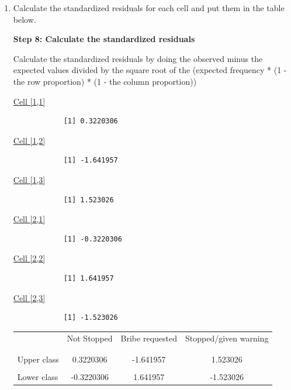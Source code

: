 \documentclass[12pt,letterpaper]{article}
\begin{document}
\begin{enumerate}
		\newpage
		
		\item [(c)] Calculate the standardized residuals for each cell and put them in the table below.
		
		\vspace{.5cm}
		
		\noindent \textbf{Step 8: Calculate the standardized residuals}
		
		\noindent Calculate the standardized residuals by doing the observed minus the expected values divided by the square root of the (expected frequency * (1 - the row proportion) * (1 - the column proportion))
		
		\vspace{1cm}
		
		\noindent \underline{Cell [1,1]}
		  
		\begin{verbatim}
			[1] 0.3220306
		\end{verbatim}
		
		\noindent \underline{Cell [1,2]}
		  
		\begin{verbatim}
			[1] -1.641957
		\end{verbatim}
		
		\noindent \underline{Cell [1,3]}
		  
		\begin{verbatim}
			[1] 1.523026
		\end{verbatim}
		
		\noindent \underline{Cell [2,1]}
		  
		\begin{verbatim}
			[1] -0.3220306
		\end{verbatim}
		
		\noindent \underline{Cell [2,2]}
		  
		\begin{verbatim}
			[1] 1.641957
		\end{verbatim}
		
		\noindent \underline{Cell [2,3]}
		  
		\begin{verbatim}
			[1] -1.523026
		\end{verbatim}
		
		\begin{table}[h]
			\centering
			\begin{tabular}{l | c c c }
				& Not Stopped & Bribe requested & Stopped/given warning \\
				\\[-1.8ex] 
				\hline \\[-1.8ex]
				Upper class & 0.3220306 & -1.641957 & 1.523026 \\
				\\
				Lower class & -0.3220306 & 1.641957 & -1.523026 \\
				

\end{tabular}
\end{table}
\end{enumerate}
\end{document}
